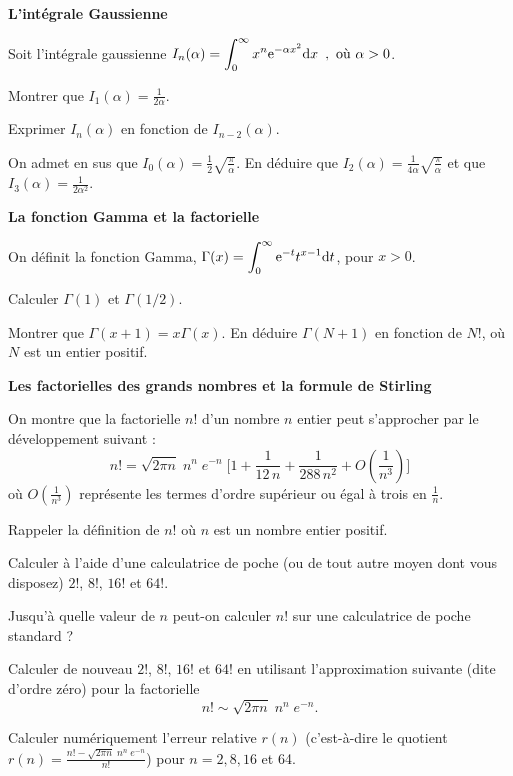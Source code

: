 {\sffamily\bfseries{L'intégrale Gaussienne}}

Soit l'intégrale gaussienne $ \displaystyle I_n(\alpha) = \int_{0}^{\infty} x^{n} {\rm e}^{-\alpha x^2} {\rm d}x\enspace, \textrm{ où } \alpha>0 $.

\question
Montrer que $I_1(\alpha)=\frac{1}{2\alpha}$.

\question
Exprimer $I_n(\alpha)$ en fonction de $I_{n-2}(\alpha)$.

\question
On admet en sus que $I_0(\alpha)=\frac{1}{2}\sqrt{\frac{\pi}{\alpha}}$. En déduire que $I_2(\alpha)=\frac{1}{4\alpha} \sqrt{\frac{\pi}{\alpha}}$ et que $I_3(\alpha)= \frac{1}{2\alpha^2}$.

\bigskip

{\sffamily\bfseries{La fonction  Gamma et la factorielle}}

On définit la fonction Gamma,  
$
\displaystyle \Gamma(x)  = \int^\infty_0 {\rm e}^{-t} t^{x-1} {\rm d}t 
$, pour $x>0$.

\question
Calculer $\Gamma(1)$ et $\Gamma (1/2)$.

\question
Montrer que $ \Gamma (x+1) = x \Gamma(x)$. En déduire $\Gamma(N+1)$ en fonction de $N!$, où $N$ est un entier positif.

\bigskip

{\sffamily\bfseries{Les factorielles des grands nombres et la formule de Stirling}}

On montre que la factorielle $n!$ d'un nombre $n$ entier peut s'approcher par le développement suivant : 
$$
\label{eqStirling}
n! = \sqrt{2 \pi n} \; n^n \; e^{-n} \; \Big[ 1 + \frac{1}{12\, n} + \frac{1}{288\, n^2}+ O(\frac{1}{n^3}) \Big]
$$
où $O(\frac{1}{n^3})$ représente les termes d'ordre supérieur ou égal à trois en $\frac{1}{n}$.

\question
Rappeler la définition de $n!$ où $n$ est un nombre entier positif.

\question
Calculer à l'aide d'une calculatrice de poche (ou de tout autre moyen dont vous disposez) $2!$, $8!$, $16!$ et $64!$.

\question
Jusqu'à quelle valeur de $n$ peut-on calculer $n!$ sur une calculatrice de poche standard ?

\question
Calculer de nouveau $2!$, $8!$, $16!$ et $64!$ en utilisant l'approximation suivante (dite d'ordre zéro) pour la factorielle
$$
n! \sim \sqrt{2 \pi n} \; n^n \; e^{-n} .
$$

\question
Calculer numériquement l'erreur relative $r(n)$ (c'est-à-dire le quotient $r(n)=\frac{n!-\sqrt{2 \pi n} \; n^n \; e^{-n}}{n!}$) pour $n=2, 8, 16$ et 64.

